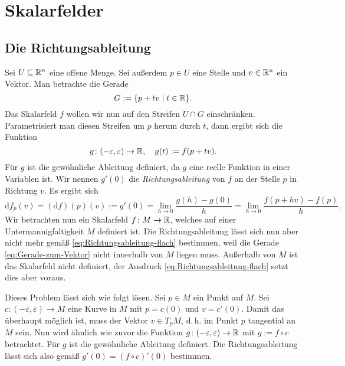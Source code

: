 \section{Skalarfelder}

\subsection{Die Richtungsableitung}

Sei $U\subseteq\mathbb R^n$ eine offene Menge. Sei außerdem $p\in U$ 
eine Stelle und $v\in\mathbb R^n$ ein Vektor. Man betrachte die Gerade
\begin{equation}\label{eq:Gerade-zum-Vektor}
G := \{p+tv\mid t\in\mathbb R\}.
\end{equation}
Das Skalarfeld $f$ wollen wir nun auf den Streifen $U\cap G$
einschränken. Parametrisiert man diesen Streifen um $p$ herum durch
$t$, dann ergibt sich die Funktion%
\begin{equation}
g\colon (-\varepsilon,\varepsilon)\to\mathbb R,\quad g(t):=f(p+tv).
\end{equation}
Für $g$ ist die gewöhnliche Ableitung definiert, da $g$
eine reelle Funktion in einer Variablen ist. Wir nennen $g'(0)$ die
\emph{Richtungsableitung} von $f$ an der Stelle $p$ in Richtung $v$.
Es ergibt sich%
\begin{equation}\label{eq:Richtungsableitung-flach}
\mathrm df_p(v) = (\mathrm df)(p)(v) := g'(0)
= \lim_{h\to 0}\frac{g(h)-g(0)}{h}
= \lim_{h\to 0}\frac{f(p+hv)-f(p)}{h}.
\end{equation}
Wir betrachten nun ein Skalarfeld $f\colon M\to\mathbb R$, welches
auf einer Untermannigfaltigkeit $M$ definiert ist.
Die Richtungsableitung lässt sich nun aber nicht mehr gemäß
\eqref{eq:Richtungsableitung-flach} bestimmen, weil die Gerade
\eqref{eq:Gerade-zum-Vektor} nicht innerhalb von $M$ liegen muss.
Außerhalb von $M$ ist das Skalarfeld nicht definiert, der Ausdruck
\eqref{eq:Richtungsableitung-flach} setzt dies aber voraus.

Dieses Problem lässt sich wie folgt lösen. Sei $p\in M$ ein Punkt
auf $M$. Sei $c\colon (-\varepsilon,\varepsilon)\to M$ eine Kurve
in $M$ mit $p=c(0)$ und $v=c'(0)$. Damit das überhaupt möglich ist, muss
der Vektor $v\in T_p M$, d.\,h. im Punkt $p$ tangential an $M$ sein.
Nun wird ähnlich wie zuvor die Funktion
$g\colon (-\varepsilon,\varepsilon)\to\mathbb R$ mit $g:=f\circ c$ betrachtet.
Für $g$ ist die gewöhnliche Ableitung definiert. Die Richtungsableitung
lässt sich also gemäß $g'(0)=(f\circ c)'(0)$ bestimmen.

